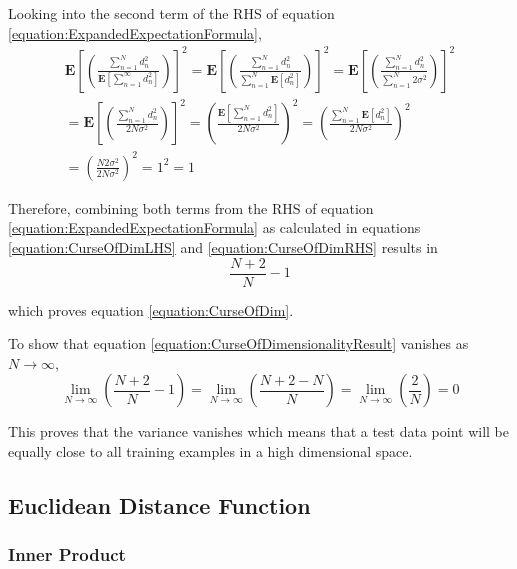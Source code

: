 \documentclass[a4paper,12pt]{article}
\begin{document}
Looking into the second term of the RHS of equation \ref{equation:ExpandedExpectationFormula},
\begin{equation}
\label{equation:CurseOfDimRHS}
\begin{split}
\mathbf{E}\left[\left(\frac{\sum_{n=1}^{N} d_{n}^{2}}{\mathbf{E}[\sum_{n=1}^{\infty} d_{n}^{2}]}\right)\right]^{2} 
= 
\mathbf{E}\left[\left(\frac{\sum_{n=1}^{N} d_{n}^{2}}{\sum_{n=1}^{N} \mathbf{E}[d_{n}^{2}]}\right)\right]^{2} 
=
\mathbf{E}\left[\left(\frac{\sum_{n=1}^{N} d_{n}^{2}}{\sum_{n=1}^{N} 2\sigma^{2}}\right)\right]^{2} \\
= 
\mathbf{E}\left[\left(\frac{\sum_{n=1}^{N} d_{n}^{2}}{2N\sigma^{2}}\right)\right]^{2} 
= 
\left(\frac{\mathbf{E}[\sum_{n=1}^{N} d_{n}^{2}]}{2N\sigma^{2}}\right)^{2} 
=
\left(\frac{\sum_{n=1}^{N} \mathbf{E}[ d_{n}^{2}]}{2N\sigma^{2}}\right)^{2} \\
=
\left(\frac{N2\sigma^{2}}{2N\sigma^{2}}\right)^{2} = 1^{2} = 1
\end{split}
\end{equation} 

Therefore, combining both terms from the RHS of equation  \ref{equation:ExpandedExpectationFormula} as calculated in equations \ref{equation:CurseOfDimLHS} and \ref{equation:CurseOfDimRHS}  results in 
\begin{equation}
\label{equation:CurseOfDimensionalityResult}
 \frac{N + 2}{N} - 1
\end{equation} 

which proves equation \ref{equation:CurseOfDim}. 

To show that equation \ref{equation:CurseOfDimensionalityResult} vanishes as $N\to\infty$,
\begin{equation}
\label{equation:CurseOfDimVanish}
\lim_{N\to\infty} \left(\frac{N + 2}{N} - 1\right) = 
\lim_{N\to\infty} \left(\frac{N + 2 - N}{N}\right) = 
\lim_{N\to\infty} \left(\frac{2}{N}\right) = 0
\end{equation} 

This proves that the variance vanishes which means that a test data point will be equally close to all training examples in a high dimensional space. 
\subsection{Euclidean Distance Function}
\subsubsection{Inner Product}
\end{document}
